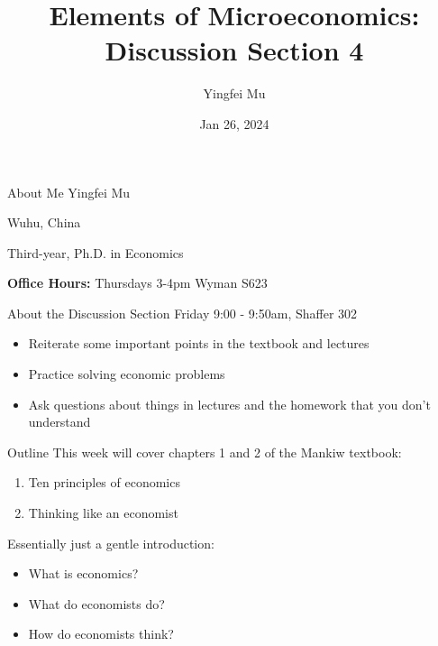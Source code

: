 \documentclass[aspectratio=169]{beamer}
\title{Elements of Microeconomics: \\
       Discussion Section 4}
\author{Yingfei Mu}
\date{Jan 26, 2024}
\begin{document}
\begin{frame}
    \titlepage 
\end{frame}

\begin{frame}{About Me}
Yingfei Mu\\
\vspace{5pt}

Wuhu, China\\
\vspace{5pt}

Third-year, Ph.D. in Economics\\
\vspace{5pt}

\textbf{Office Hours:} Thursdays 3-4pm Wyman S623
\end{frame}

\begin{frame}{About the Discussion Section}
Friday 9:00 - 9:50am, Shaffer 302\bigskip
\begin{itemize}
\item Reiterate some important points in the textbook and lectures
\item Practice solving economic problems
\item Ask questions about things in lectures and the homework that you don’t understand
\end{itemize}
\end{frame}


\begin{frame}{Outline}
    This week will cover chapters 1 and 2 of the Mankiw textbook:
    \begin{enumerate}
        \item Ten principles of economics
        \item Thinking like an economist
    \end{enumerate}

    \medskip

    Essentially just a gentle introduction: 
    \begin{itemize}
        \item What is economics?
        \item What do economists do?
        \item How do economists think?
    \end{itemize}
\end{frame}

\end{document}
